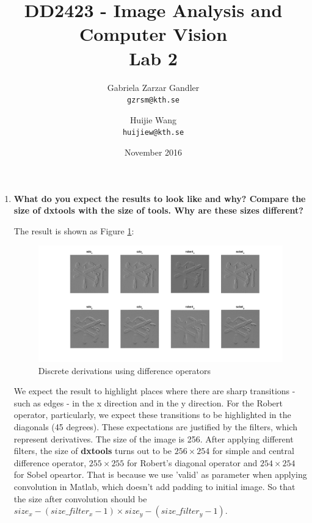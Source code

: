 \documentclass{article}
\title{DD2423 - Image Analysis and Computer Vision\\
  \large Lab 2}
\author{
  Gabriela Zarzar Gandler\\
  \texttt{gzrsm@kth.se}
  \and
 Huijie Wang\\
  \texttt{huijiew@kth.se}
}
\date{November 2016}
\begin{document}
\maketitle




\begin{enumerate}
\section{Difference operators}
    \item %
    \textbf{What do you expect the results to look like and why? Compare the size of dxtools with the size of tools. Why are these sizes different?}
    \par
    The result is shown as Figure \ref{fig:q1}:
    \begin{figure}[H]
        \centering
        \includegraphics[width=\linewidth]{Lab2-Q1.png}
        \caption{Discrete derivations using difference operators}
        \label{fig:q1}
    \end{figure}
    \par
    We expect the result to highlight places where there are sharp transitions - such as edges - in the x direction and in the y direction. For the Robert operator, particularly, we expect these transitions to be highlighted in the diagonals (45 degrees). These expectations are justified by the filters, which represent derivatives. The size of the image is 256. After applying different filters, the size of \textbf{dxtools} turns out to be $256 \times 254$ for simple and central difference operator, $255 \times 255$ for Robert's diagonal operator and $254 \times 254$ for Sobel opeartor. That is because we use 'valid' as parameter when applying convolution in Matlab, which doesn't add padding to initial image. So that the size after convolution should be $size_x - (size\_filter_x-1) \times  size_y - (size\_filter_y-1)$.
    


\end{enumerate}
\end{document}
